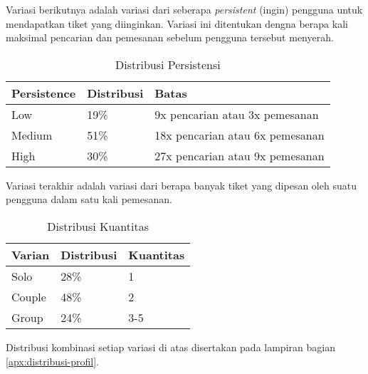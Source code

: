Variasi berikutnya adalah variasi dari seberapa \textit{persistent} (ingin) pengguna untuk mendapatkan tiket yang diinginkan. Variasi ini ditentukan dengna berapa kali maksimal pencarian dan pemesanan sebelum pengguna tersebut menyerah.

\begin{table}[h]
    \centering
    \begin{tabular}{|l|l|l|}
        \hline
        \textbf{Persistence} & \textbf{Distribusi} & \textbf{Batas}                      \\
        \hline
        Low                  & 19\%                & 9x pencarian atau 3x pemesanan      \\
        \hline
        Medium               & 51\%                & 18x pencarian atau 6x     pemesanan \\
        \hline
        High                 & 30\%                & 27x pencarian atau 9x pemesanan     \\
        \hline
    \end{tabular}
    \caption{Distribusi Persistensi}
\end{table}

Variasi terakhir adalah variasi dari berapa banyak tiket yang dipesan oleh suatu pengguna dalam satu kali pemesanan.

\begin{table}[h]
    \centering
    \begin{tabular}{|l|l|l|}
        \hline
        \textbf{Varian} & \textbf{Distribusi} & \textbf{Kuantitas} \\
        \hline
        Solo            & 28\%                & 1                  \\
        \hline
        Couple          & 48\%                & 2                  \\
        \hline
        Group           & 24\%                & 3-5                \\
        \hline
    \end{tabular}
    \caption{Distribusi Kuantitas}
\end{table}

Distribusi kombinasi setiap variasi di atas disertakan pada lampiran bagian \ref{apx:distribusi-profil}.
